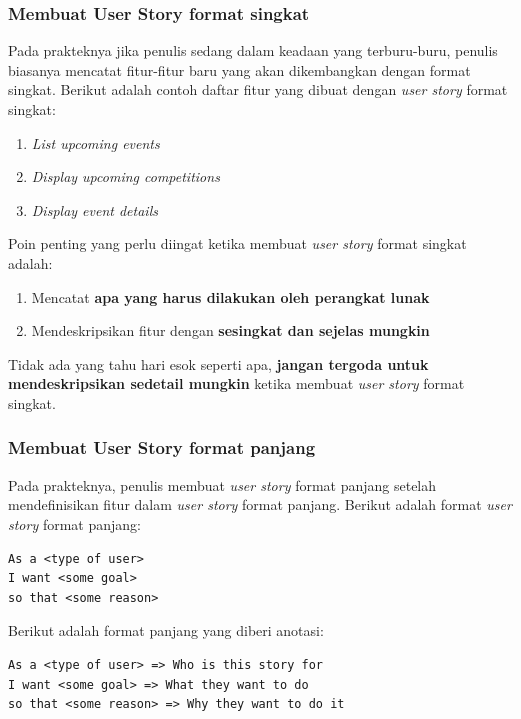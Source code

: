 \documentclass[a4paper, 12pt, oneside]{report}
\begin{document}
\newpage

\subsubsection{Membuat User Story format singkat}

\onehalfspacing Pada prakteknya jika penulis sedang dalam keadaan yang terburu-buru, penulis biasanya mencatat fitur-fitur baru yang akan dikembangkan dengan format singkat. Berikut adalah contoh daftar fitur yang dibuat dengan \textit{user story} format singkat:

\begin{enumerate}
  \item \textit{List upcoming events}
  \item \textit{Display upcoming competitions}
  \item \textit{Display \textit{event} details}
\end{enumerate}

\onehalfspacing Poin penting yang perlu diingat ketika membuat \textit{user story} format singkat adalah:

\begin{enumerate}
  \item Mencatat \textbf{apa yang harus dilakukan oleh perangkat lunak}
  \item Mendeskripsikan fitur dengan \textbf{sesingkat dan sejelas mungkin}
\end{enumerate}

\onehalfspacing Tidak ada yang tahu hari esok seperti apa, \textbf{jangan tergoda untuk mendeskripsikan sedetail mungkin} ketika membuat \textit{user story} format singkat.

\subsubsection{Membuat User Story format panjang}

\onehalfspacing Pada prakteknya, penulis membuat \textit{user story} format panjang setelah mendefinisikan fitur dalam \textit{user story} format panjang. Berikut adalah format \textit{user story} format panjang:

\begin{lstlisting}[frame=single]
As a <type of user>
I want <some goal>
so that <some reason>
\end{lstlisting}

Berikut adalah format panjang yang diberi anotasi:

\begin{lstlisting}[frame=single]
As a <type of user> => Who is this story for
I want <some goal> => What they want to do
so that <some reason> => Why they want to do it
\end{lstlisting}
\end{document}
